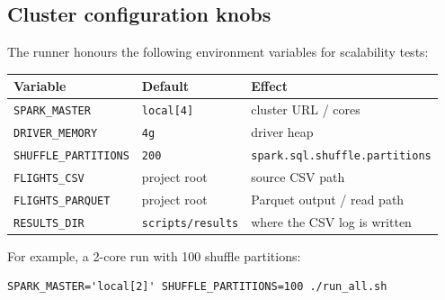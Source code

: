 \documentclass{article}
\begin{document}
\subsection*{Cluster configuration knobs}

The runner honours the following environment variables for scalability tests:

\begin{table}[H]
\centering
\begin{tabular}{@{}lll@{}}
\toprule
\textbf{Variable} & \textbf{Default} & \textbf{Effect} \\
\midrule
\texttt{SPARK\_MASTER}        & \texttt{local[4]} & cluster URL / cores \\
\texttt{DRIVER\_MEMORY}       & \texttt{4g}       & driver heap \\
\texttt{SHUFFLE\_PARTITIONS}  & \texttt{200}      & \texttt{spark.sql.shuffle.partitions} \\
\texttt{FLIGHTS\_CSV}         & project root      & source CSV path \\
\texttt{FLIGHTS\_PARQUET}     & project root      & Parquet output / read path \\
\texttt{RESULTS\_DIR}         & \texttt{scripts/results} & where the CSV log is written \\
\bottomrule
\end{tabular}
\end{table}

For example, a 2-core run with 100 shuffle partitions:
\begin{footnotesize}
\begin{verbatim}
SPARK_MASTER='local[2]' SHUFFLE_PARTITIONS=100 ./run_all.sh
\end{verbatim}
\end{footnotesize}
\end{document}
